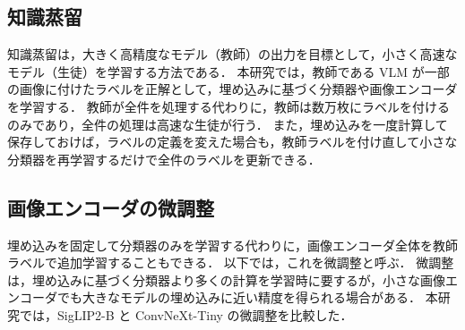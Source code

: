 \subsection{知識蒸留}
知識蒸留\cite{ref_kd}は，大きく高精度なモデル（教師）の出力を目標として，小さく高速なモデル（生徒）を学習する方法である．
本研究では，教師である VLM が一部の画像に付けたラベルを正解として，埋め込みに基づく分類器や画像エンコーダを学習する．
教師が全件を処理する代わりに，教師は数万枚にラベルを付けるのみであり，全件の処理は高速な生徒が行う．
また，埋め込みを一度計算して保存しておけば，ラベルの定義を変えた場合も，教師ラベルを付け直して小さな分類器を再学習するだけで全件のラベルを更新できる．

\subsection{画像エンコーダの微調整}
埋め込みを固定して分類器のみを学習する代わりに，画像エンコーダ全体を教師ラベルで追加学習することもできる．
以下では，これを微調整と呼ぶ．
微調整は，埋め込みに基づく分類器より多くの計算を学習時に要するが，小さな画像エンコーダでも大きなモデルの埋め込みに近い精度を得られる場合がある．
本研究では，SigLIP2-B と ConvNeXt-Tiny\cite{ref_convnext} の微調整を比較した．
